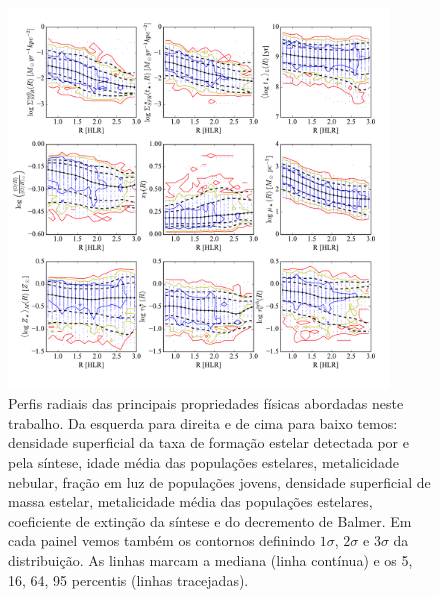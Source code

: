 \begin{figure}
	\centering
	\includegraphics[width=0.9\textwidth]{figuras/props_R.pdf}
	\caption[Perfis radiais das propriedades físicas.]
	{Perfis radiais das principais propriedades físicas abordadas neste trabalho. Da esquerda para
direita e de cima para baixo temos: densidade superficial da taxa de formação estelar detectada por
\Halpha e pela síntese, idade média das populações estelares, metalicidade nebular, fração em luz de
populações jovens, densidade superficial de massa estelar, metalicidade média das populações
estelares, coeficiente de extinção da síntese e do decremento de Balmer. Em cada painel vemos também
os contornos definindo $1\sigma$, $2\sigma$ e $3\sigma$ da distribuição. As linhas marcam a mediana
(linha contínua) e os 5, 16, 64, 95 percentis (linhas tracejadas).}
	\label{fig:RadProfProps}
\end{figure}

